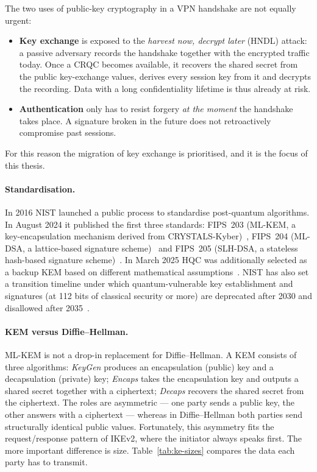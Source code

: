 The two uses of public-key cryptography in a VPN handshake are not equally
urgent:
\begin{itemize}
    \item \textbf{Key exchange} is exposed to the \emph{harvest now, decrypt
    later} (HNDL) attack: a passive adversary records the handshake together
    with the encrypted traffic today. Once a CRQC becomes available, it
    recovers the shared secret from the public key-exchange values, derives
    every session key from it and decrypts the recording. Data with a long
    confidentiality lifetime is thus already at risk.
    \item \textbf{Authentication} only has to resist forgery \emph{at the
    moment} the handshake takes place. A signature broken in the future does not
    retroactively compromise past sessions.
\end{itemize}
For this reason the migration of key exchange is prioritised, and it is the
focus of this thesis.

\paragraph{Standardisation.}
In 2016 NIST launched a public process to standardise post-quantum
algorithms. In August 2024 it published the first three standards:
FIPS~203 (ML-KEM, a key-encapsulation mechanism derived from
CRYSTALS-Kyber)~\cite{fips203}, FIPS~204 (ML-DSA, a lattice-based signature
scheme)~\cite{fips204} and FIPS~205 (SLH-DSA, a stateless hash-based signature
scheme)~\cite{fips205}. In March 2025 HQC was additionally selected as a backup
KEM based on different mathematical assumptions~\cite{nistir8545}. NIST has also
set a transition timeline under which quantum-vulnerable key establishment and
signatures (at 112 bits of classical security or more) are deprecated after 2030
and disallowed after 2035~\cite{nistir8547}.

\paragraph{KEM versus Diffie--Hellman.}
ML-KEM is not a drop-in replacement for Diffie--Hellman. A KEM consists of three
algorithms: \emph{KeyGen} produces an encapsulation (public) key and
a decapsulation (private) key; \emph{Encaps} takes the encapsulation key and
outputs a shared secret together with a ciphertext; \emph{Decaps} recovers the
shared secret from the ciphertext. The roles are asymmetric --- one party
sends a public key, the other answers with a ciphertext --- whereas in
Diffie--Hellman both parties send structurally identical public values.
Fortunately, this asymmetry fits the request/response pattern of IKEv2, where
the initiator always speaks first. The more important difference is size.
Table~\ref{tab:ke-sizes} compares the data each party has to transmit.

